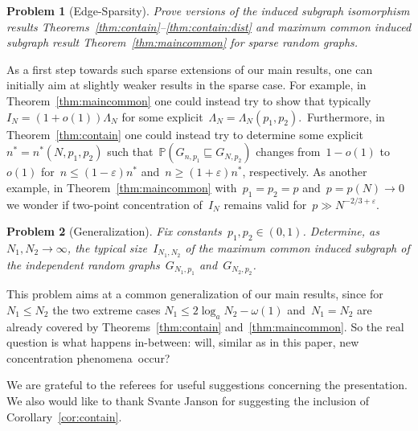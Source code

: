 \documentclass{article}
\newcommand{\eps}{\varepsilon}
\renewcommand{\Pr}{\mathbb{P}}
\newcommand{\isub}{\sqsubseteq}
\newtheorem{problem}{Problem}
\begin{document}
\begin{problem}[Edge-Sparsity]\label{prb:sparse}
Prove versions of the induced subgraph isomorphism results Theorems~\ref{thm:contain}--\ref{thm:contain:dist} and maximum common induced subgraph result Theorem~\ref{thm:maincommon} for sparse random graphs. 
\end{problem}
As a first step towards such sparse extensions of our main results, one can initially aim at slightly weaker results in the sparse case.  
For example, in Theorem~\ref{thm:maincommon} one could instead try to show that typically~$I_N = (1+o(1))\Lambda_N$ for some explicit~$\Lambda_N=\Lambda_N(p_1,p_2)$.\
Furthermore, in Theorem~\ref{thm:contain} one could instead try to determine some explicit~$n^*=n^*(N,p_1,p_2)$ such that~$\Pr(G_{n,p_1} \isub G_{N,p_2})$ changes from~$1-o(1)$ to~$o(1)$ for~$n \le(1-\eps)n^*$ and~$n \ge (1+\eps) n^*$, respectively.
As another example, in Theorem~\ref{thm:maincommon} with~$p_1=p_2=p$ and~$p=p(N) \to 0$ we wonder if two-point concentration of~$I_N$ remains valid for~$p \gg N^{-2/3+\eps}$.


\begin{problem}[Generalization]\label{prb:general}
Fix constants~$p_1,p_2 \in (0,1)$. 
Determine, as~$N_1,N_2 \to \infty$, the typical size~$I_{N_1,N_2}$ of the maximum common induced subgraph of the independent random graphs~$G_{N_1,p_1}$ and~$G_{N_2,p_2}$.
\end{problem}
This problem aims at a common generalization of our main results, 
since for~$N_1 \le N_2$ the two extreme cases $N_1 \le 2\log_a N_2-\omega(1)$ and~$N_1=N_2$ 
are already covered by Theorems~\ref{thm:contain} and~\ref{thm:maincommon}. 
So the real question is what happens in-between: 
will, similar as in this paper, new concentration phenomena~occur?





We are grateful to the referees for useful suggestions concerning the presentation. 
We also would like to thank Svante Janson for suggesting the inclusion of Corollary~\ref{cor:contain}.
\end{document}
